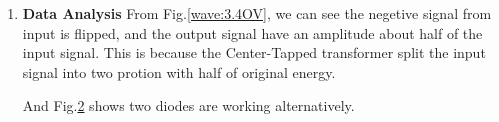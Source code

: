 \begin{enumerate}[I]
\begin{figure}[h]
\begin{subfigure}[h]{0.4\textwidth}
                    \caption{Diode Voltage}
                    \label{wave:3.4DV}
                \end{subfigure}
            \end{figure}
        \item \textbf{Data Analysis}\newline
            From Fig.\ref{wave:3.4OV}, we can see the negetive signal from input is flipped, and the output signal have an amplitude about half of the input signal. This is because the Center-Tapped transformer split the input signal into two protion with half of original energy.\par
            
            And Fig.\ref{wave:3.4DV} shows two diodes are working alternatively.
    \end{enumerate}

